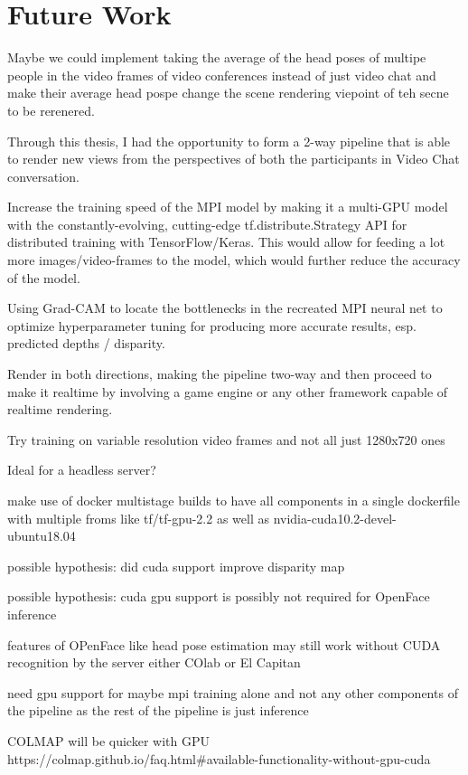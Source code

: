 \section{Future Work}\label{sec1:future-work}
Maybe we could implement taking the average of the head poses of multipe people in the video frames of video conferences instead of just video chat and make their average head pospe change the scene rendering viepoint of teh secne to be rerenered.

Through this thesis, I had the opportunity to form a 2-way pipeline that is able to render new views from the perspectives of both the participants in Video Chat conversation.

Increase the training speed of the MPI model by making it a multi-GPU model with the constantly-evolving, cutting-edge tf.distribute.Strategy API for distributed training with TensorFlow/Keras.
This would allow for feeding a lot more images/video-frames to the model, which would further reduce the accuracy of the model.

Using Grad-CAM to locate the bottlenecks in the recreated MPI neural net to optimize hyperparameter tuning for producing more accurate results, esp. predicted depths / disparity.

Render in both directions, making the pipeline two-way and then proceed to make it realtime by involving a game engine or any other framework capable of realtime rendering. 

Try training on variable resolution video frames and not all just 1280x720 ones

Ideal for a headless server?

make use of docker multistage builds to have all components in a single dockerfile
with multiple froms like tf/tf-gpu-2.2 as well as nvidia-cuda10.2-devel-ubuntu18.04

possible hypothesis: did cuda support improve disparity map

possible hypothesis: cuda gpu support is possibly not required for OpenFace inference

features of OPenFace like head pose estimation may still work without CUDA recognition by the server either COlab or El Capitan 

need gpu support for maybe mpi training alone and not any other components of the pipeline as the rest of the pipeline is just inference

COLMAP will be quicker with GPU
https://colmap.github.io/faq.html#available-functionality-without-gpu-cuda

